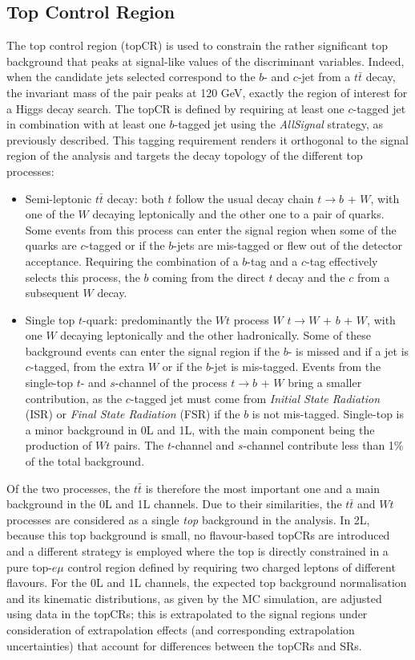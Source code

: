 \subsection{Top Control Region}
The top control region (topCR) is used to constrain the rather significant top background that peaks at signal-like values of the discriminant variables. Indeed, when the candidate jets selected correspond to the $b$- and $c$-jet from a $t\bar{t}$ decay, the invariant mass of the pair peaks at 120 GeV, exactly the region of interest for a Higgs decay search. The topCR is defined by requiring at least one $c$-tagged jet in combination with at least one $b$-tagged jet using the \textit{AllSignal} strategy, as previously described. This tagging requirement renders it orthogonal to the signal region of the analysis and targets the decay topology of the different top processes: 
\begin{itemize}
\item Semi-leptonic $t\bar{t}$ decay: both $t$ follow the usual decay chain  $t \rightarrow b$ + $W$, with one of the $W$ decaying leptonically and the other one to a pair of quarks. Some events from this process can enter the signal region when some of the quarks are $c$-tagged or if the $b$-jets are mis-tagged or flew out of the detector acceptance. Requiring the combination of a $b$-tag and a $c$-tag effectively selects this process, the $b$ coming from the direct $t$ decay and the $c$ from a subsequent $W$ decay. 
\item Single top $t$-quark: predominantly the $Wt$ process $W$ $t \rightarrow W$ +  $b$ + $W$, with one $W$ decaying leptonically and the other hadronically. Some of these background events can enter the signal region if the $b$- is missed and if a jet is $c$-tagged, from the extra $W$ or if the $b$-jet is mis-tagged. Events from the single-top $t$- and $s$-channel of the process $t \rightarrow b$ + $W$ bring a smaller contribution, as the $c$-tagged jet must come from \textit{Initial State Radiation} (ISR) or \textit{Final State Radiation} (FSR) if the $b$ is not mis-tagged. Single-top is a minor background in 0L and 1L, with the main component being the production of $Wt$ pairs. The $t$-channel and $s$-channel contribute less than 1\% of the total background.
\end{itemize}

Of the two processes, the $t\bar{t}$ is therefore the most important one and a main background in the 0L and 1L channels. Due to their similarities, the $t\bar{t}$ and $Wt$ processes are considered as a single \textit{top} background in the analysis. In 2L, because this top background is small, no flavour-based topCRs are introduced and a different strategy is employed where the top is directly constrained in a pure top-$e\mu$ control region defined by requiring two charged leptons of different flavours. For the 0L and 1L channels, the expected top background normalisation and its kinematic distributions, as given by the MC simulation, are adjusted using data in the topCRs; this is extrapolated to the signal regions under consideration of extrapolation effects (and corresponding extrapolation uncertainties) that account for differences between the topCRs and SRs. \\

